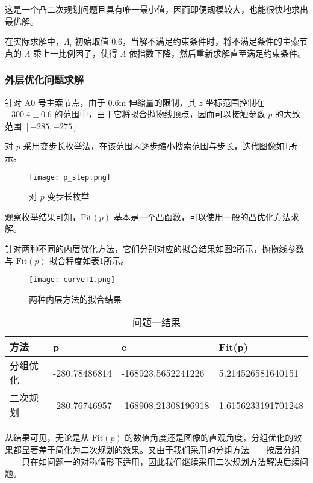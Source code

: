 \documentclass[withoutpreface,bwprint,fontset=macnew]{cumcmthesis} %
\begin{document}
		这是一个凸二次规划问题且具有唯一最小值，因而即便规模较大，也能很快地求出最优解。

		在实际求解中，$\Lambda_i$ 初始取值 $0.6$，当解不满足约束条件时，将不满足条件的主索节点的 $\Lambda$ 乘上一比例因子，使得 $\Lambda$ 依指数下降，然后重新求解直至满足约束条件。
		
	\subsubsection{外层优化问题求解}
		
		针对 A0 号主索节点，由于 0.6m 伸缩量的限制，其 $z$ 坐标范围控制在 $-300.4\pm0.6$ 的范围中，由于它将拟合抛物线顶点，因而可以接触参数 $p$ 的大致范围 $[-285, -275]$.
		
		对 $p$ 采用变步长枚举法，在该范围内逐步缩小搜索范围与步长，迭代图像如\ref{fig:p_step}所示。
		
		\begin{figure}[!h]
			\centering
			\texttt{[image: p\_step.png]} %
			\caption{对 $p$ 变步长枚举}
			\label{fig:p_step}
		\end{figure}
	
		观察枚举结果可知，$\text{Fit}(p)$ 基本是一个凸函数，可以使用一般的凸优化方法求解。
		
		针对两种不同的内层优化方法，它们分别对应的拟合结果如图\ref{fig:curveT1}所示，抛物线参数与 $\text{Fit}(p)$ 拟合程度如表\ref{tab:resultT1}所示。
		
		\begin{figure}[!h]
			\centering
			\texttt{[image: curveT1.png]} %
			\caption{两种内层方法的拟合结果}
			\label{fig:curveT1}
		\end{figure}
	
		\begin{table}[!h]
			\centering
			\caption{问题一结果}
			\label{tab:resultT1}
			\begin{tabular}{|l|l|l|l|}
				\hline
				方法 & p & c & Fit(p) \\ \hline
				分组优化 & -280.78486814 & -168923.5652241226 & 5.214526581640151 \\ \hline
				二次规划 & -280.76746957 & -168908.21308196918 & 1.6156233191701248 \\ \hline
			\end{tabular}
		\end{table}
	
		从结果可见，无论是从 $\text{Fit}(p)$ 的数值角度还是图像的直观角度，分组优化的效果都显著差于简化为二次规划的效果。又由于我们采用的分组方法——按层分组——只在如问题一的对称情形下适用，因此我们继续采用二次规划方法解决后续问题。
		
\end{document}
